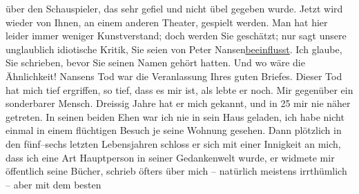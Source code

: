 \begin{ledgroupsized}[t]{13cm}
               über den Schauspieler, das sehr gefiel und nicht übel gegeben wurde. Jetzt wird
               wieder \label{K_L02303-2v}\label{K_L02303-2h} von Ihnen, an einem anderen Theater, gespielt werden. Man hat hier
               leider immer weniger Kunstverstand; doch werden Sie geschätzt; nur sagt unsere
               unglaublich idiotische Kritik, Sie seien von Peter
                  Nansen\uline{beeinflusst}. Ich glaube, Sie schrieben, bevor Sie
               seinen Namen gehört hatten. Und wo wäre die Ähnlichkeit!\pend
           \pstart
           Nansens Tod war die Veranlassung Ihres guten
               Briefes. Dieser Tod hat mich tief ergriffen, so tief, dass es mir ist, als lebte er
               noch. Mir gegenüber ein sonderbarer Mensch. Dreissig Jahre hat er mich gekannt, und
                  \introOben{}in 25\introOben{} mir nie näher getreten. In seinen beiden Ehen war
               ich nie in sein Haus geladen, ich habe nicht einmal in einem flüchtigen Besuch je
               seine Wohnung {\pb}gesehen. Dann
               plötzlich in den fünf–sechs letzten Lebensjahren schloss er sich mit einer Innigkeit
               an mich, dass ich eine Art Hauptperson in seiner Gedankenwelt wurde, er widmete mir
               öffentlich seine Bücher,
               schrieb öfters über mich – natürlich meistens irrthümlich – aber mit dem besten

\end{ledgroupsized}
